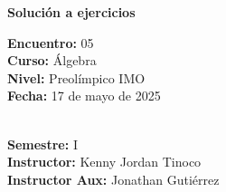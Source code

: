 
\begin{center}
    \textbf{\Large Solución a ejercicios}
\end{center}

\begin{multicols}{2}
{
    \textbf{Encuentro:} 05\\
    \textbf{Curso:} Álgebra\\
    \textbf{Nivel:} Preolímpico IMO\\
    \textbf{Fecha:} 17 de mayo de 2025\\
    \begin{flushright}
        \ \\
        \textbf{Semestre:} I\\
        \textbf{Instructor:} Kenny Jordan Tinoco\\
        \textbf{Instructor Aux:} Jonathan Gutiérrez
    \end{flushright}
}
\end{multicols}
\thispagestyle{first-page-style}